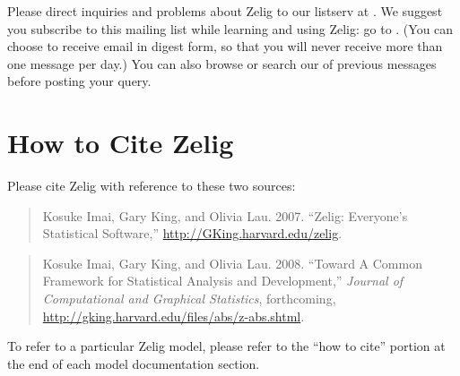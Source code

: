 Please direct inquiries and problems about Zelig to our listserv at
.  We
suggest you subscribe to this mailing list while learning and using
Zelig: go to .  (You can choose to receive email
in digest form, so that you will never receive more than one message
per day.)  You can also browse or search our
 of
previous messages before posting your query.

\section{How to Cite Zelig}

Please cite Zelig with reference to these two sources:
\begin{quote}
  Kosuke Imai, Gary King, and Olivia Lau. 2007. ``Zelig: Everyone's
  Statistical Software,'' \url{http://GKing.harvard.edu/zelig}.
\end{quote}
\begin{quote}
  Kosuke Imai, Gary King, and Olivia Lau. 2008. ``Toward A Common
  Framework for Statistical Analysis and Development,'' \emph{Journal
    of Computational and Graphical Statistics}, forthcoming,
  \url{http://gking.harvard.edu/files/abs/z-abs.shtml}.
\end{quote}

To refer to a particular Zelig model, please refer to the ``how to
cite'' portion at the end of each model documentation section.

